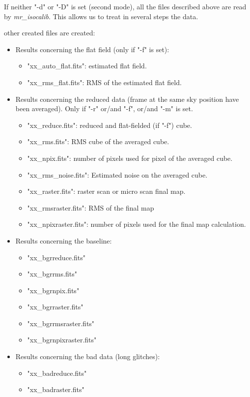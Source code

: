 If neither "-d" or "-D" is set (second mode), all the files described above are read 
by {\em mr\_isocalib}. This allows us to treat in several steps the data.

other created files are created:
\begin{itemize}
\item Results concerning the flat field (only if "-f" is set):
\begin{itemize}
\item "xx\_auto\_flat.fits": estimated flat field.
\item "xx\_rms\_flat.fits": RMS of the estimated flat field.
\end{itemize}
\item Results concerning the reduced data (frame at the same sky position
have been averaged). Only if "-r" or/and "-f", or/and "-m" is set.
\begin{itemize}
\item "xx\_reduce.fits": reduced and flat-fielded (if "-f") cube.
\item "xx\_rms.fits": RMS cube of the averaged cube.
\item "xx\_npix.fits": number of pixels used for pixel of the averaged cube.
\item "xx\_rms\_noise.fits": Estimated noise on the averaged cube.
\item "xx\_raster.fits": raster scan or micro scan final map.
\item "xx\_rmsraster.fits": RMS of the final map
\item "xx\_npixraster.fits": number of pixels used
 for the final map calculation.
\end{itemize}
\item Results concerning the baseline:
\begin{itemize}
\item "xx\_bgrreduce.fits"
\item "xx\_bgrrms.fits"
\item "xx\_bgrnpix.fits"
\item "xx\_bgrraster.fits"
\item "xx\_bgrrmsraster.fits"
\item "xx\_bgrnpixraster.fits"
\end{itemize}
\item Results concerning the bad data (long glitches):
\begin{itemize}
\item "xx\_badreduce.fits"
\item "xx\_badraster.fits"
\end{itemize}
\end{itemize}

